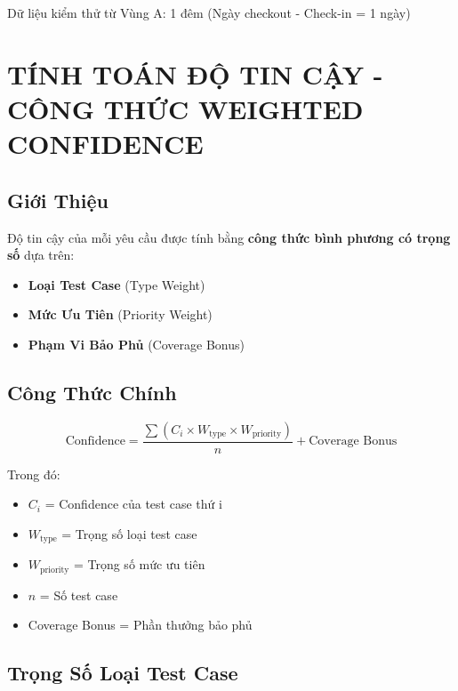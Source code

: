 \documentclass[12pt, a4paper]{article}
\begin{document}
Dữ liệu kiểm thử từ Vùng A: 1 đêm (Ngày checkout - Check-in = 1 ngày)

\newpage

\section{TÍNH TOÁN ĐỘ TIN CẬY - CÔNG THỨC WEIGHTED CONFIDENCE}

\subsection{Giới Thiệu}

Độ tin cậy của mỗi yêu cầu được tính bằng \textbf{công thức bình phương có trọng số} dựa trên:
\begin{itemize}
    \item \textbf{Loại Test Case} (Type Weight)
    \item \textbf{Mức Ưu Tiên} (Priority Weight)
    \item \textbf{Phạm Vi Bảo Phủ} (Coverage Bonus)
\end{itemize}

\subsection{Công Thức Chính}

\begin{equation}
\boxed{\text{Confidence} = \frac{\sum (C_i \times W_{\text{type}} \times W_{\text{priority}})}{n} + \text{Coverage Bonus}}
\end{equation}

Trong đó:
\begin{itemize}
    \item $C_i$ = Confidence của test case thứ i
    \item $W_{\text{type}}$ = Trọng số loại test case
    \item $W_{\text{priority}}$ = Trọng số mức ưu tiên
    \item $n$ = Số test case
    \item Coverage Bonus = Phần thưởng bảo phủ
\end{itemize}

\subsection{Trọng Số Loại Test Case}
\end{document}
